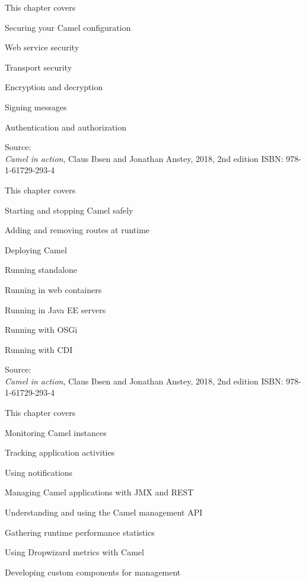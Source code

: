 \documentclass[Screen16to9,17pt]{foils}
\begin{document}

This chapter covers
\begin{list2}
\item Securing your Camel configuration
\item Web service security
\item Transport security
\item Encryption and decryption
\item Signing messages
\item Authentication and authorization
\end{list2}

Source: {\footnotesize\\
\emph{Camel in action}, Claus Ibsen and Jonathan Anstey, 2018, 2nd edition
ISBN: 978-1-61729-293-4}


This chapter covers

\begin{list2}
\item Starting and stopping Camel safely
\item Adding and removing routes at runtime
\item Deploying Camel
\item Running standalone
\item Running in web containers
\item Running in Java EE servers
\item Running with OSGi
\item Running with CDI
\end{list2}

Source: {\footnotesize\\
\emph{Camel in action}, Claus Ibsen and Jonathan Anstey, 2018, 2nd edition
ISBN: 978-1-61729-293-4}


This chapter covers
\begin{list2}
\item Monitoring Camel instances
\item Tracking application activities
\item Using notifications
\item Managing Camel applications with JMX and REST
\item Understanding and using the Camel management API
\item Gathering runtime performance statistics
\item Using Dropwizard metrics with Camel
\item Developing custom components for management
\end{list2}
\end{document}
